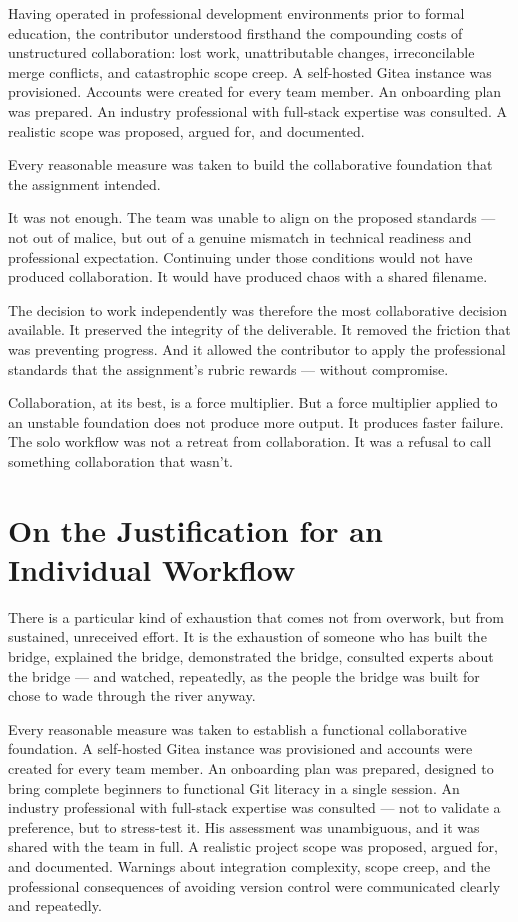 \documentclass[11pt,a4paper]{book}
\begin{document}
Having operated in professional development environments prior to formal education, the contributor understood firsthand the compounding costs of unstructured collaboration: lost work, unattributable changes, irreconcilable merge conflicts, and catastrophic scope creep. A self-hosted Gitea instance was provisioned. Accounts were created for every team member. An onboarding plan was prepared. An industry professional with full-stack expertise was consulted. A realistic scope was proposed, argued for, and documented.

Every reasonable measure was taken to build the collaborative foundation that the assignment intended.

It was not enough. The team was unable to align on the proposed standards --- not out of malice, but out of a genuine mismatch in technical readiness and professional expectation. Continuing under those conditions would not have produced collaboration. It would have produced chaos with a shared filename.

The decision to work independently was therefore the most collaborative decision available. It preserved the integrity of the deliverable. It removed the friction that was preventing progress. And it allowed the contributor to apply the professional standards that the assignment's rubric rewards --- without compromise.

Collaboration, at its best, is a force multiplier. But a force multiplier applied to an unstable foundation does not produce more output. It produces faster failure. The solo workflow was not a retreat from collaboration. It was a refusal to call something collaboration that wasn't.

\section{On the Justification for an Individual Workflow}

There is a particular kind of exhaustion that comes not from overwork, but from sustained, unreceived effort. It is the exhaustion of someone who has built the bridge, explained the bridge, demonstrated the bridge, consulted experts about the bridge --- and watched, repeatedly, as the people the bridge was built for chose to wade through the river anyway.

Every reasonable measure was taken to establish a functional collaborative foundation. A self-hosted Gitea instance was provisioned and accounts were created for every team member. An onboarding plan was prepared, designed to bring complete beginners to functional Git literacy in a single session. An industry professional with full-stack expertise was consulted --- not to validate a preference, but to stress-test it. His assessment was unambiguous, and it was shared with the team in full. A realistic project scope was proposed, argued for, and documented. Warnings about integration complexity, scope creep, and the professional consequences of avoiding version control were communicated clearly and repeatedly.
\end{document}
